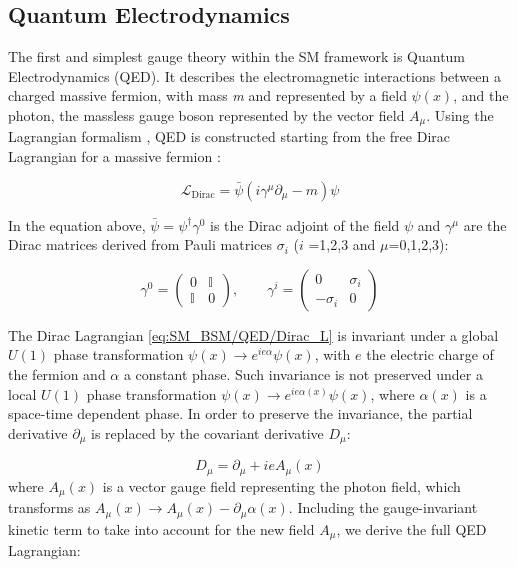 \subsection{Quantum Electrodynamics}\label{subsec:SM_BSM/SM/QED}
The first and simplest gauge theory within the SM framework is Quantum Electrodynamics (QED). It describes the electromagnetic interactions between a charged massive fermion, with mass \textit{m} and represented by a field $\psi(x)$, and the photon, the massless gauge boson represented by the vector field $A_\mu$.
Using the Lagrangian formalism \cite{Feynman_QFT}, QED is constructed starting from the free Dirac Lagrangian for a massive fermion \cite{pich_QED_EW}:

\begin{equation}\label{eq:SM_BSM/QED/Dirac_L}
    \mathcal{L}_\text{Dirac} = \bar{\psi} (i\gamma^\mu \partial_\mu - m) \psi
\end{equation}

\noindent In the equation above, $\bar{\psi} = \psi^\dagger \gamma^0$ is the Dirac adjoint of the field $\psi$ and $\gamma^\mu$ are the Dirac matrices derived from Pauli matrices $\sigma_i$ ($i$ =1,2,3 and $\mu$=0,1,2,3): 

\begin{equation}\label{eq:SM_BSM/QED/PauliMatrix}
\gamma^0 = \begin{pmatrix} 0 & \mathbb{I} \\ \mathbb{I} & 0 \end{pmatrix}, \qquad
\gamma^i = \begin{pmatrix} 0 & \sigma_i \\ -\sigma_i & 0 \end{pmatrix}
\end{equation}

\noindent The Dirac Lagrangian \ref{eq:SM_BSM/QED/Dirac_L} is invariant under a global $U(1)$ phase transformation $\psi(x) \to e^{i e \alpha} \psi(x)$, with $e$ the electric charge of the fermion and $\alpha$ a constant phase.
Such invariance is not preserved under a local $U(1)$ phase transformation $\psi(x) \to e^{i e \alpha(x)} \psi(x)$, where $\alpha(x)$ is a space-time dependent phase. In order to preserve the invariance, the partial derivative $\partial_\mu$ is replaced by the covariant derivative $D_\mu$:

\begin{equation}\label{eq:SM_BSM/QED/cov_der}
    D_\mu = \partial_\mu + i e A_\mu(x)
\end{equation}
where $A_\mu(x)$ is a vector gauge field representing the photon field, which transforms as $A_\mu(x) \to A_\mu(x) - \partial_\mu \alpha(x)$. Including the gauge-invariant kinetic term to take into account for the new field $A_\mu$, we derive the full QED Lagrangian:

